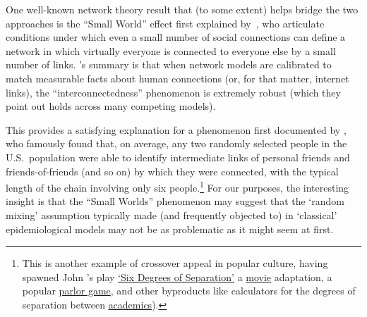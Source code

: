 
    One well-known network theory result that (to some extent) helps bridge the two approaches is the ``Small World'' effect first explained by~\cite{wsSmallWorld}, who articulate conditions under which even a small number of social connections can define a network in which virtually everyone is connected to everyone else by a small number of links.  \cite{barabasi2016network}'s summary is that when network models are calibrated to match measurable facts about human connections (or, for that matter, internet links), the ``interconnectedness'' phenomenon is extremely robust (which they point out holds across many competing models).

    This provides a satisfying explanation for a phenomenon first documented by \cite{milgram1967small}, who famously found that, on average, any two randomly selected people in the U.S.\ population were able to identify intermediate links of personal friends and friends-of-friends (and so on) by which they were connected, with the typical length of the chain involving only six people.\footnote{This is another example of crossover appeal in popular culture, having spawned John \cite{guareSixDegrees}'s play \href{https://en.wikipedia.org/wiki/Six_Degrees_of_Separation_(play)}{`Six Degrees of Separation'} a  \href{https://en.wikipedia.org/wiki/Six_Degrees_of_Separation_(film)}{movie} adaptation, a popular \href{https://en.wikipedia.org/wiki/Six_Degrees_of_Kevin_Bacon}{parlor game}, and other byproducts like calculators for the degrees of separation between \href{https://oakland.edu/enp/}{academics}).}  For our purposes, the interesting insight is that the ``Small Worlds'' phenomenon may suggest that the `random mixing' assumption typically made (and frequently objected to) in `classical' epidemiological models may not be as problematic as it might seem at first.



